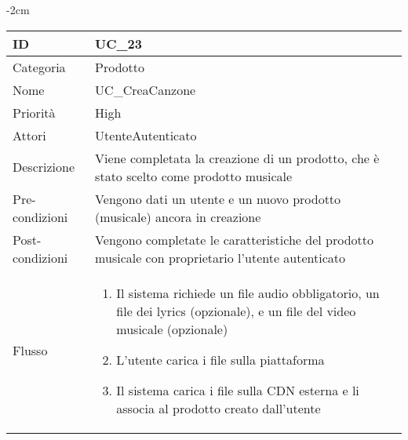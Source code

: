 \begin{center}
\begin{table}[bp]
    \centering
    \addtolength{\leftskip} {-2cm}
\begin{tabular}{ |p{2.6cm}|p{13cm}|  }
\hline
ID & UC\_23\\\hline
Categoria & Prodotto \\\hline
Nome & UC\_CreaCanzone \\\hline
Priorità & High \\\hline
Attori &  UtenteAutenticato \\\hline
Descrizione & Viene completata la creazione di un prodotto, che è stato scelto come prodotto musicale\\\hline
Pre-condizioni &   Vengono dati un utente e un nuovo prodotto (musicale) ancora in creazione\\\hline
Post-condizioni &  Vengono completate le caratteristiche del prodotto musicale con proprietario l'utente autenticato\\\hline
Flusso &  	\begin{enumerate}
			\item Il sistema richiede un file audio obbligatorio, un file dei lyrics (opzionale), e un file del video musicale (opzionale)
			\item L'utente carica i file sulla piattaforma
			\item Il sistema carica i file sulla CDN esterna e li associa al prodotto creato dall'utente
		\end{enumerate}\\\hline
\end{tabular}
\label{table_use_case:23}\newline
\end{table}


\end{center}
